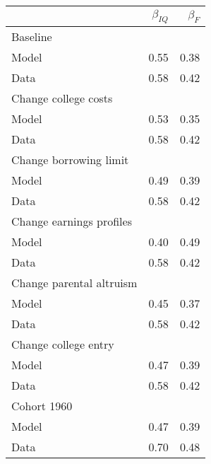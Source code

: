 \begin{tabular}{lrr}
\hline
  & $\beta_{IQ}$  & $\beta_{F}$  \\ 
\hline
Baseline &   &   \\ 
Model & 0.55  & 0.38  \\ 
Data & 0.58  & 0.42  \\ 
Change college costs &   &   \\ 
Model & 0.53  & 0.35  \\ 
Data & 0.58  & 0.42  \\ 
Change borrowing limit &   &   \\ 
Model & 0.49  & 0.39  \\ 
Data & 0.58  & 0.42  \\ 
Change earnings profiles &   &   \\ 
Model & 0.40  & 0.49  \\ 
Data & 0.58  & 0.42  \\ 
Change parental altruism &   &   \\ 
Model & 0.45  & 0.37  \\ 
Data & 0.58  & 0.42  \\ 
Change college entry &   &   \\ 
Model & 0.47  & 0.39  \\ 
Data & 0.58  & 0.42  \\ 
Cohort 1960 &   &   \\ 
Model & 0.47  & 0.39  \\ 
Data & 0.70  & 0.48  \\ 
\hline
\end{tabular}%
